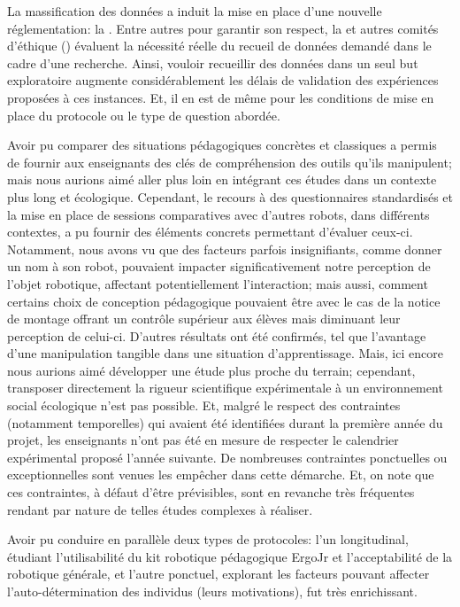 
La massification des données a induit la mise en place d'une nouvelle réglementation: la . Entre autres pour garantir son respect, la  et autres comités d'éthique (\cf {}) évaluent la nécessité réelle du recueil de données demandé dans le cadre d'une recherche. Ainsi, vouloir recueillir des données dans un seul but exploratoire augmente considérablement les délais de validation des expériences proposées à ces instances. Et, il en est de même pour les conditions de mise en place du protocole ou le type de question abordée.\par%
Avoir pu comparer des situations pédagogiques concrètes et classiques  a permis de fournir aux enseignants des clés de compréhension des outils qu'ils manipulent; mais nous aurions aimé aller plus loin en intégrant ces études dans un contexte plus long et écologique. Cependant, le recours à des questionnaires standardisés et la mise en place de sessions comparatives avec d'autres robots, dans différents contextes, a pu fournir des éléments concrets permettant d'évaluer ceux-ci. Notamment, nous avons vu que des facteurs parfois insignifiants, comme donner un nom à son robot, pouvaient impacter significativement notre perception de l'objet robotique, affectant potentiellement l'interaction; mais aussi, comment certains choix de conception pédagogique pouvaient être  avec le cas de la notice de montage offrant un contrôle supérieur aux élèves mais diminuant leur perception de celui-ci. D'autres résultats  ont été confirmés, tel que l'avantage d'une manipulation tangible dans une situation d'apprentissage.
Mais, ici encore nous aurions aimé développer une étude plus proche du terrain; cependant, transposer directement la rigueur scientifique expérimentale à un environnement social écologique n'est pas possible. Et, malgré le respect des contraintes (notamment temporelles) qui avaient été identifiées durant la première année du projet, les enseignants n'ont pas été en mesure de respecter le calendrier expérimental proposé l'année suivante.
De nombreuses contraintes ponctuelles ou exceptionnelles sont venues les empêcher dans cette démarche. Et, on note que ces contraintes, à défaut d'être prévisibles, sont en revanche très fréquentes rendant par nature de telles études complexes à réaliser.\par%
Avoir pu conduire en parallèle deux types de protocoles: l'un longitudinal, étudiant l'utilisabilité du kit robotique pédagogique ErgoJr et l'acceptabilité de la robotique générale, et l'autre ponctuel, explorant les facteurs pouvant affecter l'auto-détermination des individus (leurs motivations), fut très enrichissant.
